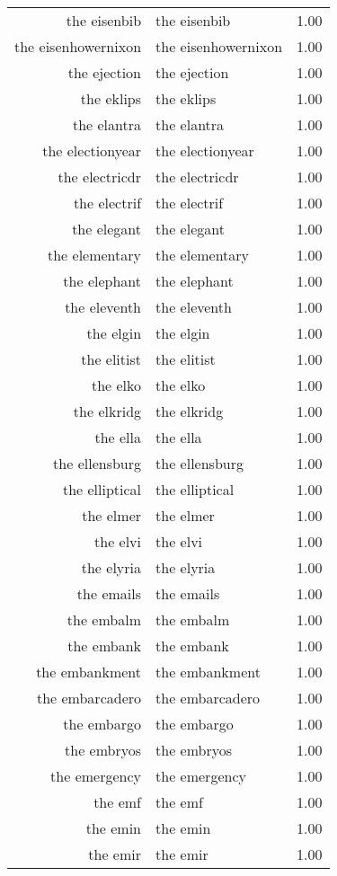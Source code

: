 \begin{table}[ht]
\begin{tabular}{rlr}
  the eisenbib & the eisenbib & 1.00 \\ 
  the eisenhowernixon & the eisenhowernixon & 1.00 \\ 
  the ejection & the ejection & 1.00 \\ 
  the eklips & the eklips & 1.00 \\ 
  the elantra & the elantra & 1.00 \\ 
  the electionyear & the electionyear & 1.00 \\ 
  the electricdr & the electricdr & 1.00 \\ 
  the electrif & the electrif & 1.00 \\ 
  the elegant & the elegant & 1.00 \\ 
  the elementary & the elementary & 1.00 \\ 
  the elephant & the elephant & 1.00 \\ 
  the eleventh & the eleventh & 1.00 \\ 
  the elgin & the elgin & 1.00 \\ 
  the elitist & the elitist & 1.00 \\ 
  the elko & the elko & 1.00 \\ 
  the elkridg & the elkridg & 1.00 \\ 
  the ella & the ella & 1.00 \\ 
  the ellensburg & the ellensburg & 1.00 \\ 
  the elliptical & the elliptical & 1.00 \\ 
  the elmer & the elmer & 1.00 \\ 
  the elvi & the elvi & 1.00 \\ 
  the elyria & the elyria & 1.00 \\ 
  the emails & the emails & 1.00 \\ 
  the embalm & the embalm & 1.00 \\ 
  the embank & the embank & 1.00 \\ 
  the embankment & the embankment & 1.00 \\ 
  the embarcadero & the embarcadero & 1.00 \\ 
  the embargo & the embargo & 1.00 \\ 
  the embryos & the embryos & 1.00 \\ 
  the emergency & the emergency & 1.00 \\ 
  the emf & the emf & 1.00 \\ 
  the emin & the emin & 1.00 \\ 
  the emir & the emir & 1.00 \\ 

\end{tabular}
\end{table}
